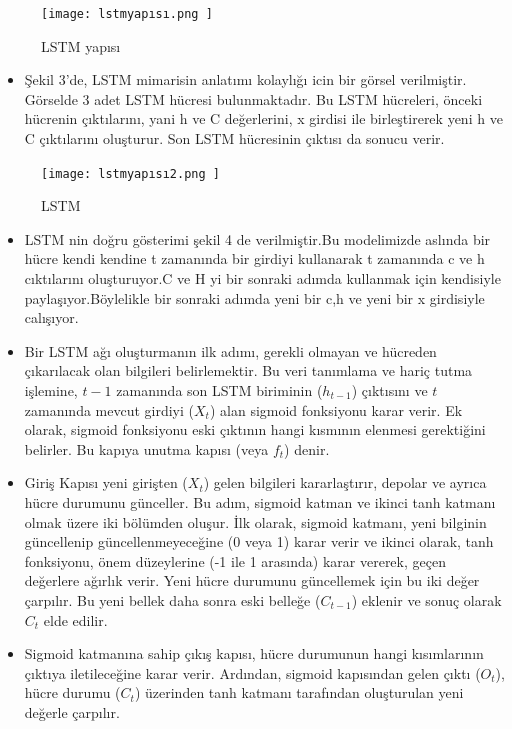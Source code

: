 \documentclass[12pt,a4paper]{article}
\begin{document}
\begin{enumerate}
\begin{figure}[h]
  	
  	\vspace{0.5cm} 
  	\centering
  	 \texttt{[image: lstmyapısı.png ]}
  	\caption{LSTM yapısı}
  		\vspace{0.7cm}
  	
  \end{figure}
\begin{itemize}
    \item Şekil 3'de, LSTM mimarisin anlatımı kolaylığı icin bir görsel verilmiştir. Görselde 3 adet LSTM hücresi bulunmaktadır. Bu LSTM hücreleri, önceki hücrenin çıktılarını, yani h ve C değerlerini, x girdisi ile birleştirerek yeni h ve C çıktılarını oluşturur. Son LSTM hücresinin çıktısı da  sonucu verir.
\end{itemize}

\begin{figure}[h]
  	
  	\vspace{0.4cm} 
  	\centering
  	 \texttt{[image: lstmyapısı2.png ]}
  	\caption{LSTM\cite{lstmyapısı2}}
  		\vspace{0.4cm}
  	
  \end{figure}
\newpage
\begin{itemize}
    \item LSTM nin doğru gösterimi şekil 4 de verilmiştir.Bu modelimizde aslında bir hücre kendi kendine t zamanında bir girdiyi kullanarak t zamanında c ve h cıktılarını oluşturuyor.C ve H yi bir sonraki adımda kullanmak için kendisiyle paylaşıyor.Böylelikle bir sonraki adımda yeni bir c,h ve yeni bir x girdisiyle calışıyor.
\item Bir LSTM ağı oluşturmanın ilk adımı, gerekli olmayan ve hücreden çıkarılacak olan bilgileri belirlemektir. 
Bu veri tanımlama ve hariç tutma işlemine, \( t-1 \) zamanında son LSTM biriminin (\( h_{t-1} \)) çıktısını ve 
\( t \) zamanında mevcut girdiyi (\( X_t \)) alan sigmoid fonksiyonu karar verir. Ek olarak, sigmoid fonksiyonu eski çıktının hangi kısmının elenmesi gerektiğini belirler. 
Bu kapıya unutma kapısı (veya \( f_t \)) denir\cite{lstmmimarisi}.
\newpage
\item Giriş Kapısı yeni girişten (\( X_t \)) gelen bilgileri kararlaştırır, depolar ve ayrıca hücre durumunu günceller.
Bu adım, sigmoid katman ve ikinci tanh katmanı olmak üzere iki bölümden oluşur.
İlk olarak, sigmoid katmanı, yeni bilginin güncellenip güncellenmeyeceğine (0 veya 1) karar verir ve 
ikinci olarak, tanh fonksiyonu, önem düzeylerine (-1 ile 1 arasında) karar vererek, geçen değerlere ağırlık verir.
Yeni hücre durumunu güncellemek için bu iki değer çarpılır. 
Bu yeni bellek daha sonra eski belleğe (\( C_{t-1} \)) eklenir ve sonuç olarak \( C_t \) elde edilir\cite{lstmmimarisi}.
\item Sigmoid katmanına sahip çıkış kapısı, hücre durumunun hangi kısımlarının çıktıya iletileceğine karar verir.
Ardından, sigmoid kapısından gelen çıktı (\(O_t\)), hücre durumu (\(C_t\)) üzerinden tanh katmanı tarafından oluşturulan yeni değerle çarpılır\cite{lstmmimarisi}.


\end{itemize}
\end{enumerate}
\end{document}
